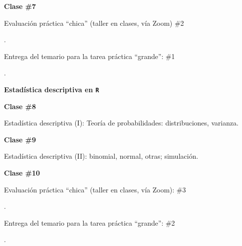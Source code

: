 \documentclass[letterpaper]{article}
\renewenvironment{itemize}{
  \begin{list}{}{
    \setlength{\leftmargin}{1.5em}
  }
}{
  \end{list}
}
\begin{document}
\begin{enumerate}
			\begin{itemize} 
				\item[$\bullet$] {\bf Clase \#7}
					\begin{itemize} 
				{\color{red}\item[\Pointinghand] Evaluaci\'on pr\'actica ``chica'' (taller en clases, v\'ia Zoom) \#2}.
				{\color{orange}\item[$\bigstar$] Entrega del temario para la tarea pr\'actica ``grande'': \#1}.
					\end{itemize}
			\end{itemize}






	\item {\bf Estad\'istica descriptiva en \texttt{R}}

			\begin{itemize} 
				\item[$\bullet$] {\bf Clase \#8}
					\begin{itemize} 
				\item[$\circ$] Estad\'istica descriptiva (I): Teor\'ia de probabilidades: distribuciones, varianza. %
					\end{itemize}
			\end{itemize}


			\begin{itemize} 
				\item[$\bullet$] {\bf Clase \#9}
					\begin{itemize} 
				\item[$\circ$] Estad\'istica descriptiva (II): binomial, normal, otras; simulaci\'on. %
					\end{itemize}
			\end{itemize}


			\begin{itemize} 
				\item[$\bullet$] {\bf Clase \#10}
					\begin{itemize} 
				{\color{red}\item[\Pointinghand] Evaluaci\'on pr\'actica ``chica'' (taller en clases, v\'ia Zoom): \#3}.
				{\color{orange}\item[$\bigstar$] Entrega del temario para la tarea pr\'actica ``grande'': \#2}.

					\end{itemize}
			\end{itemize}




\end{enumerate}
\end{document}
